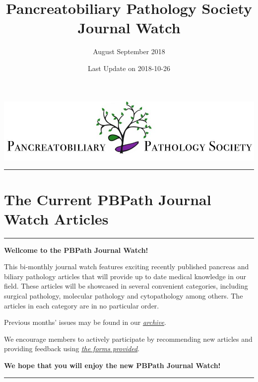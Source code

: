 \documentclass[]{article}
\title{Pancreatobiliary Pathology Society Journal Watch}
\subtitle{August September 2018}
\author{}
\date{Last Update on 2018-10-26}
\begin{document}
\maketitle

{
\setcounter{tocdepth}{5}
\tableofcontents
}
\href{http://pbpath.org/}{\includegraphics{figures/PBP_header_logo.jpg}}

\begin{center}\rule{0.5\linewidth}{\linethickness}\end{center}

\hypertarget{the-current-pbpath-journal-watch-articles}{%
\section{The Current PBPath Journal Watch
Articles}\label{the-current-pbpath-journal-watch-articles}}

\begin{center}\rule{0.5\linewidth}{\linethickness}\end{center}

\textbf{Wellcome to the PBPath Journal Watch!}

This bi-monthly journal watch features exciting recently published
pancreas and biliary pathology articles that will provide up to date
medical knowledge in our field. These articles will be showcased in
several convenient categories, including surgical pathology, molecular
pathology and cytopathology among others. The articles in each category
are in no particular order.

Previous months' issues may be found in our
\emph{\href{http://pbpath.org/journal-watch-archive/}{archive}}.

We encourage members to actively participate by recommending new
articles and providing feedback using
\emph{\href{https://docs.google.com/forms/d/e/1FAIpQLSeD3Z9J6Y7eMmiyM12f_SfAmHUlykb1zxZcwO6lg7cebGYQIQ/viewform}{the
forms provided}}.

\textbf{We hope that you will enjoy the new PBPath Journal Watch!}

\pagebreak

\begin{center}\rule{0.5\linewidth}{\linethickness}\end{center}
\end{document}

